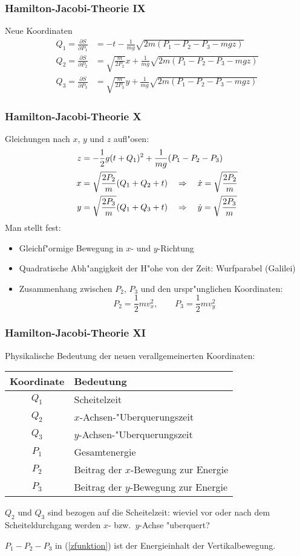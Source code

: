 \documentclass{beamer}
\begin{document}
\begin{frame}
\frametitle{Hamilton-Jacobi-Theorie IX}
Neue Koordinaten
\begin{align*}
Q_1=\frac{\partial S}{\partial P_1}&=
-t-\frac1{mg}\sqrt{2m(P_1-P_2-P_3-mgz)}
\\
Q_2=\frac{\partial S}{\partial P_2}&=
\sqrt{\frac{m}{2P_2}}x+\frac1{mg}\sqrt{2m(P_1-P_2-P_3-mgz)}
\\
Q_3=\frac{\partial S}{\partial P_3}&=
\sqrt{\frac{m}{2P_3}}y+\frac1{mg}\sqrt{2m(P_1-P_2-P_3-mgz)}
\end{align*}
\end{frame}

\begin{frame}
\frametitle{Hamilton-Jacobi-Theorie X}

Gleichungen nach $x$, $y$ und $z$ aufl"osen:
\begin{align}
z&=-\frac12g(t+Q_1)^2+\frac1{mg}(P_1-P_2-P_3)
\label{zfunktion}
\\
x&=\sqrt{\frac{2P_2}m}(Q_1+Q_2+t)
\quad\Rightarrow\quad
\dot x=\sqrt{\frac{2P_2}m}
\notag
\\
y&=\sqrt{\frac{2P_3}m}(Q_1+Q_3+t)
\quad\Rightarrow\quad
\dot y=\sqrt{\frac{2P_3}m}
\notag
\end{align}
Man stellt fest:
\begin{itemize}
\item
Gleichf"ormige Bewegung in $x$- und $y$-Richtung
\item
Quadratische Abh"angigkeit der H"ohe von der Zeit: Wurfparabel (Galilei)
\item Zusammenhang zwischen $P_2$, $P_3$ und den urspr"unglichen Koordinaten:
\[
P_2=\frac12mv_x^2,
\qquad
P_3=\frac12mv_y^2
\]
\end{itemize}
\end{frame}

\begin{frame}
\frametitle{Hamilton-Jacobi-Theorie XI}

Physikalische Bedeutung der neuen verallgemeinerten Koordinaten:
\begin{center}
\begin{tabular}{|cl|}
\hline
Koordinate&Bedeutung\\
\hline
$Q_1$&Scheitelzeit\\
$Q_2$&$x$-Achsen-"Uberquerungszeit\\
$Q_3$&$y$-Achsen-"Uberquerungszeit\\
$P_1$&Gesamtenergie\\
$P_2$&Beitrag der $x$-Bewegung zur Energie\\
$P_3$&Beitrag der $y$-Bewegung zur Energie\\
\hline
\end{tabular}
\end{center}
$Q_2$ und $Q_3$ sind bezogen auf die Scheitelzeit: wieviel vor oder nach 
dem Scheiteldurchgang werden $x$- bzw.~$y$-Achse "uberquert?

$P_1-P_2-P_3$ in (\ref{zfunktion}) ist der Energieinhalt der Vertikalbewegung.


\end{frame}
\end{document}
